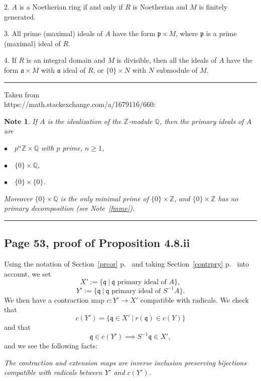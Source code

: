 \documentclass[parskip=half,fontsize=12pt]{scrartcl}%
\newcommand{\mf}{\mathfrak}
\newcommand{\aaa}{\mf a}
\newcommand{\ppp}{\mf p}
\newcommand{\qqq}{\mf q}
\newtheorem{note}[thm]{Note}
\begin{document}
2. $A$ is a Noetherian ring if and only if $R$ is Noetherian and $M$ is finitely generated.

3. All prime (maximal) ideals of $A$ have the form $\ppp\times M$, where $\ppp$ is a prime (maximal) ideal of $R$.

4. If $R$ is an integral domain and $M$ is divisible, then all the ideals of $A$ have the form $\aaa\times M$ with $\aaa$ ideal of $R$, or $\{0\}\times N$ with $N$ submodule of $M$.\bigskip\bigskip

\hrule\bigskip%

Taken from\\ https://math.stackexchange.com/a/1679116/660:\bigskip

\begin{note}%
If $A$ is the idealization of the $\mathbb Z$-module $\mathbb Q$, then the primary ideals of $A$ are  

$\bullet\quad p^n\mathbb Z\times\mathbb Q$ with $p$ prime, $n\ge1$, 

$\bullet\quad\{0\}\times\mathbb Q$,

$\bullet\quad\{0\}\times\{0\}$. 

Moreover $\{0\}\times\mathbb Q$ is the only minimal prime of $\{0\}\times\mathbb Z$, and $\{0\}\times\mathbb Z$ has no primary decomposition (see Note~\ref{fmme}).
\end{note}\bigskip

\hrule\bigskip

\subsection{Page 53, proof of Proposition 4.8.ii}\label{prycor}%

Using the notation of Section~\ref{prcor} p.~\pageref{prcor} and taking Section~\ref{contrpry} p.~\pageref{contrpry} into account, we set 
$$
X':=\{\qqq\ |\ \qqq\text{ primary ideal of }A\},
$$ 
$$
Y':=\{\qqq\ |\ \qqq\text{ primary ideal of }S^{-1}A\}.
$$ 
We then have a contraction map $c:Y'\to X'$ compatible with radicals. We check that  
$$
c(Y')=\{\qqq\in X'\ |\ r(\qqq)\in c(Y)\}
$$ 
and that 
$$
\qqq\in c(Y')\implies S^{-1}\qqq\in X',
$$ 
and we see the following facts: 

\emph{The contraction and extension maps are inverse inclusion preserving bijections compatible with radicals between $Y'$ and $c(Y')$.} 
\end{document}
